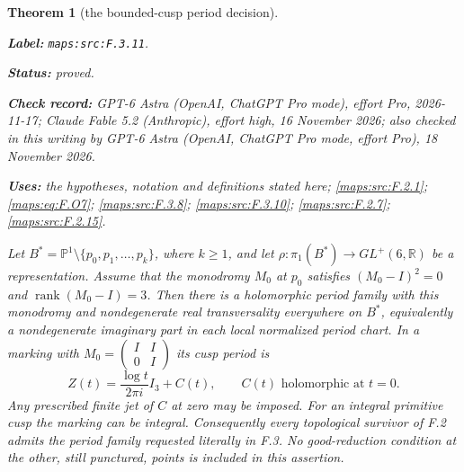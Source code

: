 \documentclass[11pt,a4paper]{article}
\newtheorem{theorem}{Theorem}[section]
\theoremstyle{definition}
\newcommand{\StatementRecord}[4]{\par\smallskip\begingroup\upshape\raggedright\noindent\textbf{Label:} \nolinkurl{#1}.\par\noindent\textbf{Status:} #2.\par\noindent\textbf{Check record:} #3.\par\noindent\textbf{Uses:} #4.\par\endgroup\smallskip}
\newcommand{\CurrentChecker}{GPT-6 Astra (OpenAI, ChatGPT Pro mode, effort Pro), 18 November 2026}
\begin{document}
\begin{theorem}[the bounded-cusp period decision]\label{maps:src:F.3.11}
\StatementRecord{maps:src:F.3.11}{proved}{GPT-6 Astra (OpenAI, ChatGPT Pro mode), effort Pro, 2026-11-17; Claude Fable 5.2 (Anthropic), effort high, 16 November 2026; also checked in this writing by \CurrentChecker}{the hypotheses, notation and definitions stated here; \cref{maps:src:F.2.1}; \cref{maps:eq:F.O7}; \cref{maps:src:F.3.8}; \cref{maps:src:F.3.10}; \cref{maps:src:F.2.7}; \cref{maps:src:F.2.15}}


Let
$B^*=\mathbb P^1\setminus\{p_0,p_1,\ldots,p_k\}$,
where $k\ge1$, and let
$\rho:\pi_1(B^*)\to GL^+(6,\mathbb R)$ be a representation.
Assume that the monodromy $M_0$ at $p_0$ satisfies
$(M_0-I)^2=0$ and $\operatorname{rank}(M_0-I)=3$.
Then there is a holomorphic period family with this monodromy
and nondegenerate real transversality everywhere on $B^*$,
equivalently a nondegenerate imaginary part in each local
normalized period chart.
In a marking with $M_0=\left(\begin{smallmatrix}I&I\\0&I\end{smallmatrix}\right)$
its cusp period is
\[
 Z(t)=\frac{\log t}{2\pi i}I_3+C(t),
 \qquad C(t)\text{ holomorphic at }t=0.
 \tag{F.O6}\label{maps:eq:F.O6}
\]
Any prescribed finite jet of $C$ at zero may be imposed.
For an integral primitive cusp the marking can be integral.
Consequently every topological survivor of F.2 admits the
period family requested literally in F.3.  No good-reduction
condition at the other, still punctured, points is included
in this assertion.

\end{theorem}
\end{document}
